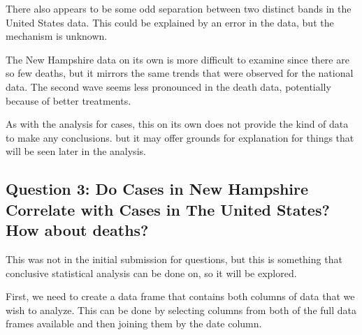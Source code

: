 \documentclass[
]{article}
\begin{document}
There also appears to be some odd separation between two distinct bands
in the United States data. This could be explained by an error in the
data, but the mechanism is unknown.

The New Hampshire data on its own is more difficult to examine since
there are so few deaths, but it mirrors the same trends that were
observed for the national data. The second wave seems less pronounced in
the death data, potentially because of better treatments.

As with the analysis for cases, this on its own does not provide the
kind of data to make any conclusions. but it may offer grounds for
explanation for things that will be seen later in the analysis.

\hypertarget{question-3-do-cases-in-new-hampshire-correlate-with-cases-in-the-united-states-how-about-deaths}{%
\subsection{Question 3: Do Cases in New Hampshire Correlate with Cases
in The United States? How about
deaths?}\label{question-3-do-cases-in-new-hampshire-correlate-with-cases-in-the-united-states-how-about-deaths}}

This was not in the initial submission for questions, but this is
something that conclusive statistical analysis can be done on, so it
will be explored.

First, we need to create a data frame that contains both columns of data
that we wish to analyze. This can be done by selecting columns from both
of the full data frames available and then joining them by the date
column.
\end{document}
